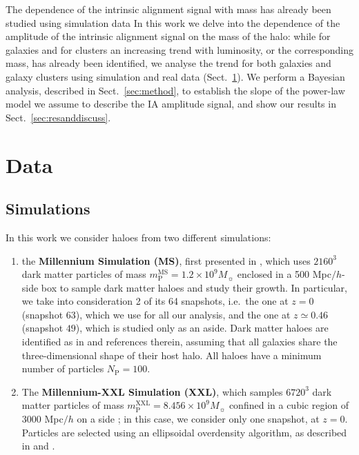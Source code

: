 \documentclass[a4paper,fleqn,usenatbib]{mnras}
\begin{document}
The dependence of the intrinsic alignment signal with mass has already been studied using simulation data \citep{Jing2002}
In this work we delve into the dependence of the amplitude of the intrinsic alignment signal on the mass of the halo: while for galaxies \citep{Joachimietal2011, Singhetal2015} and for clusters \citep{vanUitertJoachimi2017} an increasing trend with luminosity, or the corresponding mass, has already been identified, we analyse the trend for both galaxies and galaxy clusters using simulation and real data (Sect.~\ref{sec:data}). We perform a Bayesian analysis, described in Sect.~\ref{sec:method}, to establish the slope of the power-law model we assume to describe the IA amplitude signal, and show our results in Sect.~\ref{sec:resanddiscuss}.
\section{Data}
\label{sec:data}
\subsection{Simulations}
\label{subsec:sim}
In this work we consider haloes from two different simulations: 
\begin{enumerate}
\item the \textbf{Millennium Simulation (MS)}, first presented in \citet{Springeletal2005}, which uses $2160^3$ dark matter particles of mass $m_{\mathrm{P}}^{\mathrm{MS}} =1.2 \times 10^9 M_{\sun}$ enclosed in a 500 Mpc$/h$-side box to sample dark matter haloes and study their growth. In particular, we take into consideration 2 of its 64 snapshots, i.e.\ the one at $z = 0$ (snapshot $63$), which we use for all our analysis, and the one at $z \simeq 0.46$ (snapshot $49$), which is studied only as an aside. Dark matter haloes are identified as in \citet{Joachimietal2013a} and references therein, assuming that all galaxies share the three-dimensional shape of their host halo. All haloes have a minimum number of particles $N_{\mathrm{P}} = 100$.
\item The \textbf{Millennium-XXL Simulation (XXL)}, which samples $6720^3$ dark matter particles of mass $m_{\mathrm{P}}^{\mathrm{XXL}} = 8.456 \times 10^9 M_{\sun}$ confined in a cubic region of $3000$ Mpc$/h$ on a side \citep{Anguloetal2012}; in this case, we consider only one snapshot, at $z = 0$. Particles are selected using an ellipsoidal overdensity algorithm, as described in \citet{Despalietal2013} and \citet{Bonamigoetal2015}.
\end{enumerate} 
\end{document}
